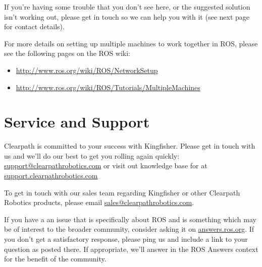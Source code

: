 \documentclass[]{clearpath-latex/clearpath-manual}
\begin{document}
If you’re having some trouble that you don’t see here, or the suggested solution isn’t working out, please get in touch so we can help you with it (see next page for contact details).

For more details on setting up multiple machines to work together in ROS, please see the following pages on the ROS wiki:

\begin{itemize}[nolistsep]


	\item \url{http://www.ros.org/wiki/ROS/NetworkSetup}
	\item \url{http://www.ros.org/wiki/ROS/Tutorials/MultipleMachines}
\end{itemize}

\newpage

\section{Service and Support}
Clearpath is committed to your success with Kingfisher. Please get in touch with us and we'll
do our best to get you rolling again quickly: \href{mailto:support@clearpathrobotics.com}{support@clearpathrobotics.com}
or visit out knowledge base for at \href{http://support.clearpathrobotics.com}{support.clearpathrobotics.com}

To get in touch with our sales team regarding Kingfisher or other Clearpath Robotics products, please
email \href{mailto:sales@clearpathrobotics.com}{sales@clearpathrobotics.com}.

If you have a an issue that is specifically about ROS and is something which may be of interest
to the broader community, consider asking it on \href{http://answers.ros.org}{answers.ros.org}.
If you don't get a satisfactory response, please ping us and include a link to your question
as posted there. If appropriate, we'll answer in the ROS Answers context for the benefit of the
community.
\end{document}
